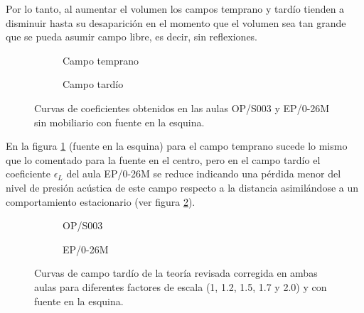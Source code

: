 Por lo tanto, al aumentar el volumen los campos temprano y tardío tienden a disminuir hasta su desaparición en el momento que el volumen sea tan grande que se pueda asumir campo libre, es decir, sin reflexiones.





\begin{figure}[ht]
    \begin{subfigure}[b]{0.4\textwidth}
    	\centering%
         {%
    }
    \caption{Campo temprano}%
    \end{subfigure}%
    \hspace{1.65cm}%
    \begin{subfigure}[b]{0.4\textwidth}%
    	\centering%
        {%
    }
    \caption{Campo tardío}%
    \end{subfigure}
    \caption{Curvas de coeficientes obtenidos en las aulas OP/S003 y EP/0-26M sin mobiliario con fuente en la esquina.}
\label{graf:comparacioncoefesquina}%
\end{figure}
\FloatBarrier 

En la figura \ref{graf:comparacioncoefesquina} (fuente en la esquina) para el campo temprano sucede lo mismo que lo comentado para la fuente en el centro, pero en el campo tardío el coeficiente $\epsilon_L$ del aula EP/0-26M se reduce indicando una pérdida menor del nivel de presión acústica de este campo respecto a la distancia asimilándose a un comportamiento estacionario (ver figura \ref{graf:campoperjudicialfactoresesquina}).

\begin{figure}[ht]
    \begin{subfigure}[b]{0.4\textwidth}
    	\centering%
         {%
    }
    \caption{OP/S003}%
    \end{subfigure}%
    \hspace{1.65cm}%
    \begin{subfigure}[b]{0.4\textwidth}%
    	\centering%
        {%
    }
    \caption{EP/0-26M}%
    \end{subfigure}
    \caption{Curvas de campo tardío de la teoría revisada corregida en ambas aulas para diferentes factores de escala (1, 1.2, 1.5, 1.7 y 2.0) y con fuente en la esquina.}
\label{graf:campoperjudicialfactoresesquina}%
\end{figure}
\FloatBarrier 


